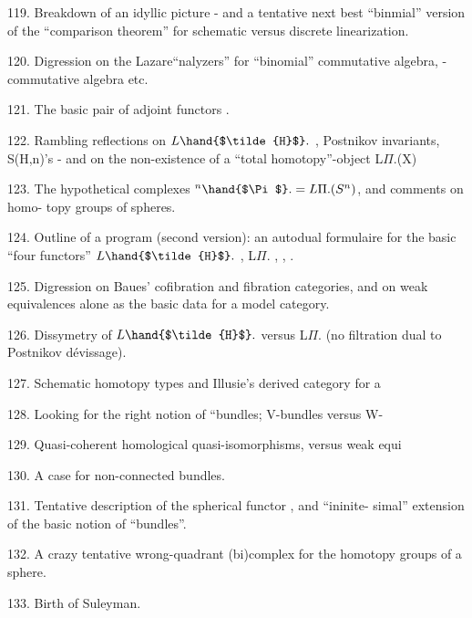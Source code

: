 \hand{\textcircled{\phantom{0}}}119. Breakdown of an idyllic picture -  and a tentative next best
``binmial'' version of the ``comparison theorem'' for schematic versus
discrete linearization.

\margin{\{}120. Digression on the Lazare``nalyzers'' for ``binomial'' commutative
algebra, \hand{$\lambda$}- commutative algebra etc.

121. The basic pair of adjoint functors  .

122. Rambling reflections on $L\hand{$\tilde{H}$}.$ , Postnikov invariants, S(H,n)'s -
and on the non-existence of a ``total homotopy''-object L$\Pi$.(X) 
 

123. The hypothetical complexes $^{n}\hand{$\Pi$}. = L\Pi.(S^{n})$, and comments on homo-%
topy groups of spheres.

\hand{\textcircled{\phantom{0}}}124. Outline of a program (second version): an autodual formulaire for
the basic ``four functors'' $L\hand{$\tilde{H}$}.$ , L$\Pi$. ,  ,  .

125. Digression on Baues' cofibration and fibration categories, and
on weak equivalences alone as the basic data for a model category.

126. Dissymetry of $L\hand{$\tilde{H}$}.$ versus L$\Pi$. (no filtration dual to Postnikov
dévissage).

127. Schematic homotopy types and Illusie's derived category for a 

128. Looking for the right notion of ``bundles; V-bundles versus W-

129. Quasi-coherent homological quasi-isomorphisms, versus weak equi

130. A case for non-connected bundles.

\hand{\textcircled{\phantom{0}}}131. Tentative description of the spherical functor , and ``ininite-%
simal'' extension of the basic notion of ``bundles''.

\hand{\textcircled{\phantom{0}}}132. A crazy\hand{,} tentative\hand{,} wrong-quadrant (bi)complex for the homotopy
groups of a sphere.
\margin{\hrulefill}

133. Birth of Suleyman.

